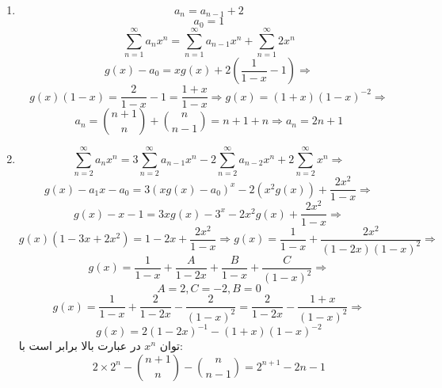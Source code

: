 \p
\begin{enumerate}
\item
$$a_n = a_{n-1} + 2$$
$$a_0 = 1$$
$$\sum_{n=1}^{\infty}a_nx^n = \sum_{n=1}^{\infty}a_{n-1}x^n + \sum_{n=1}^{\infty}2x^n$$
$$g(x) - a_0 = xg(x) + 2(\frac{1}{1-x} - 1) \Rightarrow$$
$$ g(x)(1 - x) = \frac{2}{1 - x} - 1 = \frac{1 + x}{1 - x}\Rightarrow g(x) = (1 + x)(1 - x)^{-2} \Rightarrow$$
$$a_n = \binom{n+1}{n} + \binom{n}{n-1} = n + 1 + n \Rightarrow a_n = 2n + 1$$
\item
$$\sum_{n=2}^{\infty}a_nx^n = 3\sum_{n=2}^{\infty}a_{n-1}x^n - 2\sum_{n=2}^{\infty}a_{n-2}x^n + 2\sum_{n=2}^{\infty}x^n \Rightarrow$$
$$ g(x) - a_1x - a_0 = 3(xg(x) - a_0)^x - 2(x^2g(x)) + \frac{2x^2}{1-x} \Rightarrow$$
$$ g(x) - x - 1 = 3xg(x) - 3^x - 2x^2g(x) + \frac{2x^2}{1-x}\Rightarrow$$
$$g(x)(1 - 3x + 2x^2) = 1 - 2x + \frac{2x^2}{1-x} \Rightarrow g(x) = \frac{1}{1-x} + \frac{2x^2}{(1-2x)(1-x)^2}\Rightarrow$$
$$g(x) = \frac{1}{1-x} + \frac{A}{1 - 2x} + \frac{B}{1 - x} + \frac{C}{(1-x)^2}\Rightarrow$$
$$A = 2, C = -2, B = 0$$
$$g(x) = \frac{1}{1-x} + \frac{2}{1-2x} - \frac{2}{(1-x)^2} = \frac{2}{1-2x} - \frac{1 + x}{(1-x)^2} \Rightarrow$$
$$ g(x) = 2(1-2x)^{-1} - (1+x)(1-x)^{-2}$$
توان
$x^n$
در عبارت بالا برابر است با:
$$2\times 2^n - \binom{n+1}{n} - \binom{n}{n-1} = 2^{n+1} - 2n - 1$$
\end{enumerate}
